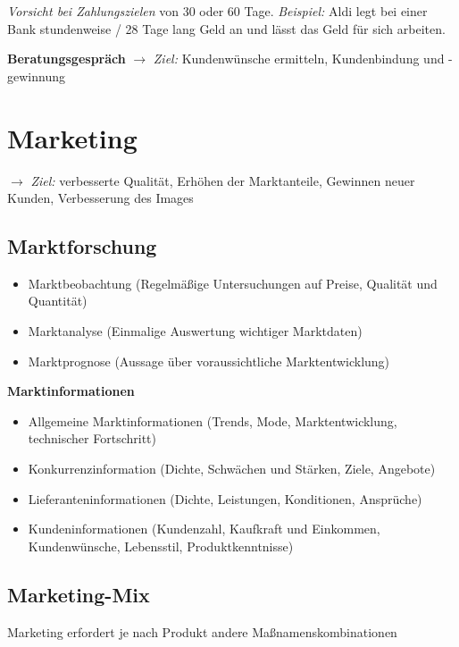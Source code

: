 \emph{Vorsicht bei Zahlungszielen} von 30 oder 60 Tage. \emph{Beispiel:}
Aldi legt bei einer Bank stundenweise / 28 Tage lang Geld an und lässt
das Geld für sich arbeiten.

\textbf{Beratungsgespräch} $\to$ \emph{Ziel:} Kundenwünsche ermitteln,
Kundenbindung und -gewinnung

\newpage

\section{Marketing}\label{marketing}

$\to$ \emph{Ziel:} verbesserte Qualität, Erhöhen der Marktanteile,
Gewinnen neuer Kunden, Verbesserung des Images

\subsection{Marktforschung}\label{marktforschung}

\begin{itemize}
\item
  Marktbeobachtung (Regelmäßige Untersuchungen auf Preise, Qualität und
  Quantität)
\item
  Marktanalyse (Einmalige Auswertung wichtiger Marktdaten)
\item
  Marktprognose (Aussage über voraussichtliche Marktentwicklung)
\end{itemize}

\textbf{Marktinformationen}

\begin{itemize}
\item
  Allgemeine Marktinformationen (Trends, Mode, Marktentwicklung,
  technischer Fortschritt)
\item
  Konkurrenzinformation (Dichte, Schwächen und Stärken, Ziele, Angebote)
\item
  Lieferanteninformationen (Dichte, Leistungen, Konditionen, Ansprüche)
\item
  Kundeninformationen (Kundenzahl, Kaufkraft und Einkommen,
  Kundenwünsche, Lebensstil, Produktkenntnisse)
\end{itemize}

\subsection{Marketing-Mix}\label{marketing-mix}

Marketing erfordert je nach Produkt andere Maßnamenskombinationen

